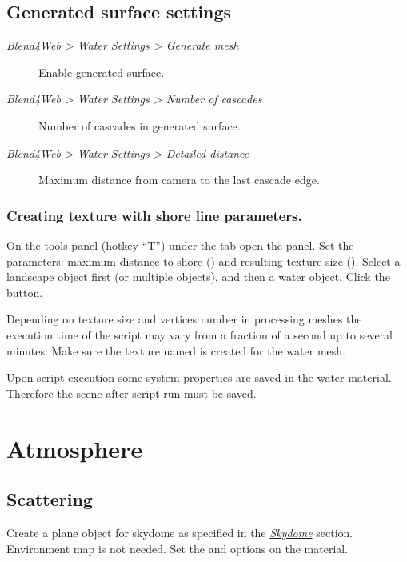 \documentclass[a4paper,12pt,oneside]{sphinxmanual}
\begin{document}
\subsection{Generated surface settings}
\label{outdoor_rendering:id23}\begin{description}
\item[{\emph{Blend4Web \textgreater{} Water Settings \textgreater{} Generate mesh}}] \leavevmode
Enable generated surface.

\item[{\emph{Blend4Web \textgreater{} Water Settings \textgreater{} Number of cascades}}] \leavevmode
Number of cascades in generated surface.

\item[{\emph{Blend4Web \textgreater{} Water Settings \textgreater{} Detailed distance}}] \leavevmode
Maximum distance from camera to the last cascade edge.

\end{description}


\subsubsection{Creating texture with shore line parameters.}
\label{outdoor_rendering:index-0}\label{outdoor_rendering:id24}\label{outdoor_rendering:shore-distance-bake}
On the tools panel (hotkey ``T'') under the  tab open the  panel. Set the parameters: maximum distance to shore () and resulting texture size (). Select a landscape object first (or multiple objects), and then a water object. Click the  button.

Depending on texture size and vertices number in processing meshes the execution time of the script may vary from a fraction of a second up to several minutes. Make sure the texture named  is created for the water mesh.

Upon script execution some system properties are saved in the water material. Therefore the scene after script run must be saved.


\section{Atmosphere}
\label{outdoor_rendering:id25}

\subsection{Scattering}
\label{outdoor_rendering:id26}
Create a plane object for skydome as specified in the {\hyperref[textures:skydome-texture]{\emph{Skydome}}} section. Environment map is not needed. Set the  and  options on the material.
\end{document}
